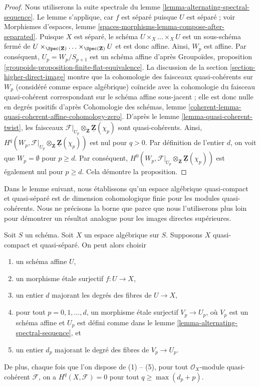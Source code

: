 \begin{proof}
Nous utiliserons la suite spectrale du
lemme \ref{lemma-alternating-spectral-sequence}.
Le lemme s'applique, car $f$ est séparé puisque $U$ est séparé ; voir
Morphismes d'espaces, lemme
\ref{spaces-morphisms-lemma-compose-after-separated}.
Puisque $X$ est séparé, le schéma $U \times_X \ldots \times_X U$ est un sous-schéma fermé
de
$U \times_{\Spec(\mathbf{Z})} \ldots \times_{\Spec(\mathbf{Z})} U$
et est donc affine. Ainsi, $W_p$ est affine. Par conséquent, $U_p = W_p/S_{p + 1}$ est un
schéma affine d'après
Groupoïdes, proposition \ref{groupoids-proposition-finite-flat-equivalence}.
La discussion de la
section \ref{section-higher-direct-image}
montre que la cohomologie des faisceaux quasi-cohérents sur $W_p$ (considéré comme espace
algébrique) coïncide avec la cohomologie du faisceau quasi-cohérent correspondant
sur le schéma affine sous-jacent ; elle est donc nulle en degrés positifs d'après
Cohomologie des schémas, lemme
\ref{coherent-lemma-quasi-coherent-affine-cohomology-zero}.
D'après
le lemme \ref{lemma-quasi-coherent-twist},
les faisceaux
$\mathcal{F}|_{U_p} \otimes_\mathbf{Z} \underline{\mathbf{Z}}(\chi_p)$
sont quasi-cohérents. Ainsi,
$H^q(W_p,
\mathcal{F}|_{U_p} \otimes_\mathbf{Z} \underline{\mathbf{Z}}(\chi_p))$
est nul pour $q > 0$. Par définition de l'entier $d$, on voit que
$W_p = \emptyset$ pour $p \geq d$. Par conséquent,
$H^0(W_p,
\mathcal{F}|_{U_p} \otimes_\mathbf{Z} \underline{\mathbf{Z}}(\chi_p))$
est également nul pour $p \geq d$.
Cela démontre la proposition.
\end{proof}

\noindent
Dans le lemme suivant, nous établissons qu'un espace algébrique quasi-compact et
quasi-séparé est de dimension cohomologique finie
pour les modules quasi-cohérents. Nous ne précisons la borne que parce que
nous l'utiliserons plus loin pour démontrer un résultat analogue pour les images directes
supérieures.

\begin{lemma}
\label{lemma-vanishing-quasi-separated}
Soit $S$ un schéma. Soit $X$ un espace algébrique sur $S$.
Supposons $X$ quasi-compact et quasi-séparé.
On peut alors choisir
\begin{enumerate}
\item un schéma affine $U$,
\item un morphisme \'etale surjectif $f : U \to X$,
\item un entier $d$ majorant les degrés des fibres de $U \to X$,
\item pour tout $p = 0, 1, \ldots, d$, un morphisme \'etale surjectif
$V_p \to U_p$, où $V_p$ est un schéma affine et $U_p$ est défini comme dans le
lemme \ref{lemma-alternating-spectral-sequence}, et
\item un entier $d_p$ majorant le degré des fibres de $V_p \to U_p$.
\end{enumerate}
De plus, chaque fois que l'on dispose de (1) -- (5), pour tout
$\mathcal{O}_X$-module quasi-cohérent $\mathcal{F}$, on a $H^q(X, \mathcal{F}) = 0$ pour tout
$q \geq \max(d_p + p)$.
\end{lemma}

